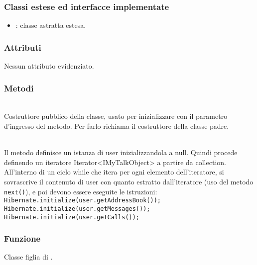 \subsubsection*{Classi estese ed interfacce implementate}

\begin{itemize}
	\item {}: classe astratta estesa.
\end{itemize}

\subsubsection*{Attributi}

Nessun attributo evidenziato.

\subsubsection*{Metodi}

\begin{description}
	\item{}\\
	Costruttore pubblico della classe, usato per inizializzare  con il parametro d'ingresso del metodo. Per farlo richiama il costruttore della classe padre.

	\item{}\\
	Il metodo definisce un istanza di  user inizializzandola a null. Quindi procede definendo un iteratore Iterator<IMyTalkObject> a partire da collection. All'interno di un ciclo while che itera per ogni elemento dell'iteratore, si sovrascrive il contenuto di user con quanto estratto dall'iteratore (uso del metodo \texttt{next()}), e poi devono essere eseguite le istruzioni:\\
	
	\verb|Hibernate.initialize(user.getAddressBook());|\\
	\verb|Hibernate.initialize(user.getMessages());|\\
	\verb|Hibernate.initialize(user.getCalls());|

\end{description}


\subsubsection*{Funzione}
Classe figlia di .


